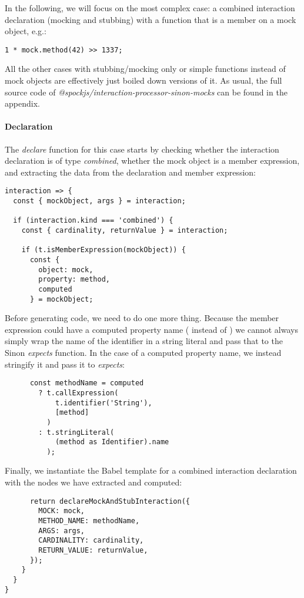 In the following,
we will focus on the most complex case:
a combined interaction declaration
(mocking and stubbing) with a
function that is a member on a mock object, e.g.:
\begin{verbatim}
1 * mock.method(42) >> 1337;
\end{verbatim}
All the other cases with
stubbing/mocking only
or simple functions
instead of mock objects
are effectively just
boiled down versions of it.
As usual, the full source code of
\textit{@spockjs/interaction-processor-sinon-mocks}
can be found in the appendix.

\paragraph{Declaration}
The \textit{declare} function for this case starts by
checking whether the interaction declaration is of type \textit{combined},
whether the mock object is a member expression, and
extracting the data from the declaration and member expression:
\begin{verbatim}
interaction => {
  const { mockObject, args } = interaction;

  if (interaction.kind === 'combined') {
    const { cardinality, returnValue } = interaction;

    if (t.isMemberExpression(mockObject)) {
      const {
        object: mock,
        property: method,
        computed
      } = mockObject;
\end{verbatim}

Before generating code,
we need to do one more thing.
Because the member expression could have a computed property name
( instead of )
we cannot always simply wrap the name of the identifier
in a string literal and pass that
to the Sinon \textit{expects} function.
In the case of a computed property name,
we instead stringify it and pass it to \textit{expects}:
\begin{verbatim}
      const methodName = computed
        ? t.callExpression(
            t.identifier('String'),
            [method]
          )
        : t.stringLiteral(
            (method as Identifier).name
          );
\end{verbatim}

Finally, we instantiate the Babel template
for a combined interaction declaration
with the nodes we have extracted and computed:
\begin{verbatim}
      return declareMockAndStubInteraction({
        MOCK: mock,
        METHOD_NAME: methodName,
        ARGS: args,
        CARDINALITY: cardinality,
        RETURN_VALUE: returnValue,
      });
    }
  }
}
\end{verbatim}

